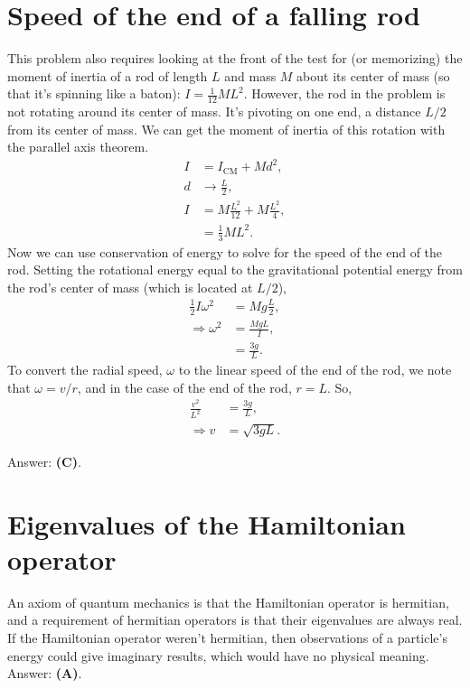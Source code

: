 \documentclass[11pt]{paper}
\newcommand{\answer}[1]{Answer: \textbf{(#1)}.}
\begin{document}
\section{Speed of the end of a falling rod}
This problem also requires looking at the front of the test for (or memorizing) the moment of inertia of a rod of length $L$ and mass $M$ about its center of mass (so that it's spinning like a baton): $I = \frac{1}{12}ML^2$.  However, the rod in the problem is not rotating around its center of mass.  It's pivoting on one end, a distance $L/2$ from its center of mass.  We can get the moment of inertia of this rotation with the parallel axis theorem.
\begin{align}
I &= I_\text{CM} + Md^2,\\
d &\rightarrow \frac{L}{2},\\
I &= M\frac{L^2}{12} + M\frac{L^2}{4},\\
&= \frac{1}{3}ML^2.
\end{align}
Now we can use conservation of energy to solve for the speed of the end of the rod.  Setting the rotational energy equal to the gravitational potential energy from the rod's center of mass (which is located at $L/2$),
\begin{align}
\frac{1}{2}I\omega^2 &= Mg\frac{L}{2},\\
\Rightarrow \omega^2 &= \frac{MgL}{I},\\
&= \frac{3g}{L}.
\end{align}
To convert the radial speed, $\omega$ to the linear speed of the end of the rod, we note that $\omega = v/r$, and in the case of the end of the rod, $r=L$.  So,
\begin{align}
\frac{v^2}{L^2} &= \frac{3g}{L},\\
\Rightarrow{v} &= \sqrt{3gL}.
\end{align}

\answer{C}

\section{Eigenvalues of the Hamiltonian operator}
An axiom of quantum mechanics is that the Hamiltonian operator is hermitian, and a requirement of hermitian operators is that their eigenvalues are always real.  If the Hamiltonian operator weren't hermitian, then observations of a particle's energy could give imaginary results, which would have no physical meaning.\\

\answer{A}
\end{document}
